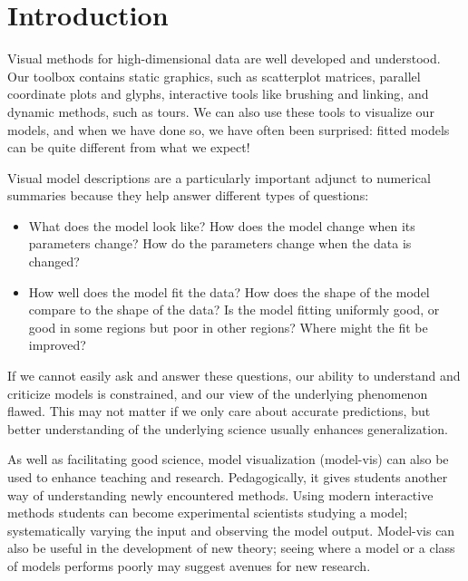 \documentclass[preprint]{imsart}
\begin{document}
\section{Introduction}

Visual methods for high-dimensional data are well developed and understood. Our toolbox contains static graphics, such as scatterplot matrices, parallel coordinate plots and glyphs, interactive tools like brushing and linking, and dynamic methods, such as tours. We can also use these tools to visualize our models, and when we have done so, we have often been surprised: fitted models can be quite different from what we expect!

Visual model descriptions are a particularly important adjunct to numerical summaries because they help answer different types of questions:

\begin{itemize} \itemsep 0in

\item What does the model look like? How does the model change when
  its parameters change? How do the parameters change when the
  data is changed?

\item How well does the model fit the data? How does the shape of the
  model compare to the shape of the data?  Is the model fitting
  uniformly good, or good in some regions but poor in other regions?
  Where might the fit be improved?

\end{itemize}

\noindent If we cannot easily ask and answer these questions, our ability to understand and criticize models is constrained, and our view of the underlying phenomenon flawed. This may not matter if we only care about accurate predictions, but better understanding of the underlying science  usually enhances generalization.

As well as facilitating good science, model visualization (model-vis) can also be used to enhance teaching and research. Pedagogically, it gives students another way of understanding newly encountered methods. Using modern interactive methods students can become experimental scientists studying a model; systematically varying the input and observing the model output. Model-vis can also be useful in the development of new theory; seeing where a model or a class of models performs poorly may suggest avenues for new research.

\end{document}
